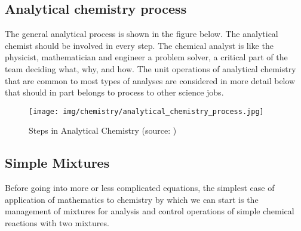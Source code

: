 	\subsection{Analytical chemistry process}
	The general analytical process is shown in the figure below. The analytical chemist should be involved in every step. The chemical analyst is like the physicist, mathematician and engineer a problem solver, a critical part of the team deciding what, why, and how. The unit operations of analytical chemistry that are common to most types of analyses are considered in more detail below that should in part belongs to process to other science jobs.
	\begin{figure}[H]
		\centering
		\texttt{[image: img/chemistry/analytical\_chemistry\_process.jpg]}
		\caption[Steps in Analytical Chemistry]{Steps in Analytical Chemistry (source: \cite{christian2013analytical})}
	\end{figure}	

	\pagebreak
	\subsection{Simple Mixtures}
	Before going into more or less complicated equations, the simplest case of application of mathematics to chemistry by which we can start is the management of mixtures for analysis and control operations of simple chemical reactions with two mixtures.
	
